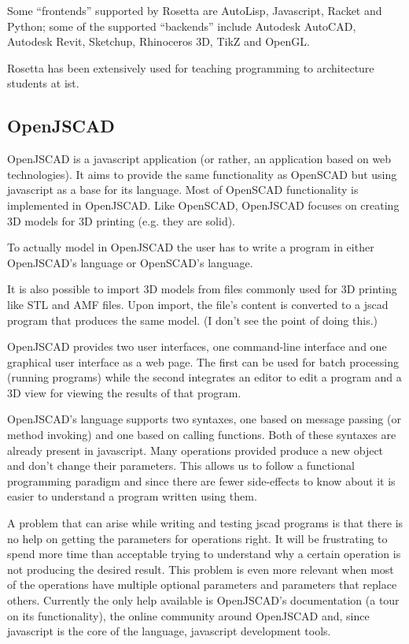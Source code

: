 \documentclass{./llncs2e/llncs}
\begin{document}
	Some ``frontends'' supported by Rosetta are AutoLisp, Javascript, Racket and Python; some of the supported ``backends'' include Autodesk AutoCAD, Autodesk Revit, Sketchup, Rhinoceros 3D, TikZ and OpenGL.

	Rosetta has been extensively used for teaching programming to architecture students at \ac{ist}. 

\subsection{OpenJSCAD}
	OpenJSCAD is a javascript application (or rather, an application based on web technologies).
	It aims to provide the same functionality as OpenSCAD but using javascript as a base for its language. 
	Most of OpenSCAD functionality is implemented in OpenJSCAD. 
	Like OpenSCAD, OpenJSCAD focuses on creating 3D models for 3D printing (e.g. they are solid).

	To actually model in OpenJSCAD the user has to write a program in either OpenJSCAD's language or OpenSCAD's language.

	It is also possible to import 3D models from files commonly used for 3D printing like STL and AMF files.
	Upon import, the file's content is converted to a jscad program that produces the same model. (I don't see the point of doing this.)

	OpenJSCAD provides two user interfaces, one command-line interface and one graphical user interface as a web page.
	The first can be used for batch processing (running programs) while the second integrates an editor to edit a program and a 3D view for viewing the results of that program.

	OpenJSCAD's language supports two syntaxes, one based on message passing (or method invoking) and one based on calling functions.
	Both of these syntaxes are already present in javascript. 
	Many operations provided produce a new object and don't change their parameters. 
	This allows us to follow a functional programming paradigm and since there are fewer side-effects to know about it is easier to understand a program written using them.

	A problem that can arise while writing and testing jscad programs is that there is no help on getting the parameters for operations right.
	It will be frustrating to spend more time than acceptable trying to understand why a certain operation is not producing the desired result. 
	This problem is even more relevant when most of the operations have multiple optional parameters and parameters that replace others. 
	Currently the only help available is OpenJSCAD's documentation (a tour on its functionality), the online community around OpenJSCAD and, since javascript is the core of the language, javascript development tools.
\end{document}

